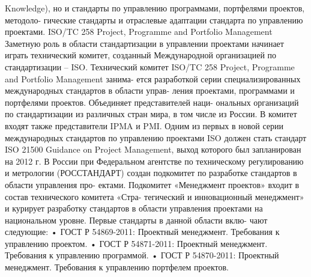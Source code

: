Knowledge), но и стандарты по управлению программами, портфелями проектов, методоло-
гические стандарты и отраслевые адаптации стандарта по управлению проектами.
ISO/TC 258 Project, Programme and Portfolio Management
Заметную роль в области стандартизации в управлении проектами начинает играть
технический комитет, созданный Международной организацией по стандартизации – ISO.
Технический комитет ISO/TC 258 Project, Programme and Portfolio Management занима-
ется разработкой серии специализированных международных стандартов в области управ-
ления проектами, программами и портфелями проектов. Объединяет представителей наци-
ональных организаций по стандартизации из различных стран мира, в том числе из России.
В комитет входят также представители IPMA и PMI.
Одним из первых в новой серии международных стандартов по управлению проектами
ISO должен стать стандарт ISO 21500 Guidance on Project Management, выход которого был
запланирован на 2012 г.
В России при Федеральном агентстве по техническому регулированию и метрологии
(РОССТАНДАРТ) создан подкомитет по разработке стандартов в области управления про-
ектами. Подкомитет «Менеджмент проектов» входит в состав технического комитета «Стра-
тегический и инновационный менеджмент» и курирует разработку стандартов в области
управления проектами на национальном уровне. Первые стандарты в данной области вклю-
чают следующие:
• ГОСТ Р 54869-2011: Проектный менеджмент. Требования к управлению проектом.
• ГОСТ Р 54871-2011: Проектный менеджмент. Требования к управлению программой.
• ГОСТ Р 54870-2011: Проектный менеджмент. Требования к управлению портфелем
проектов.


